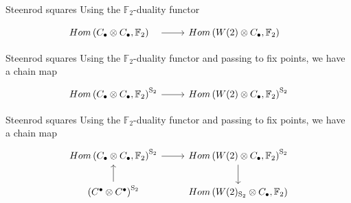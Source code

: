 \documentclass[10pt,t]{beamer} %
\newcommand{\F}{\mathbb{F}}
\renewcommand{\S}{\mathrm{S}}
\begin{document}
\begin{frame}[fragile]{Steenrod squares}
	Using the $\F_2$-duality functor
	\begin{equation*}
	\begin{tikzcd}
	Hom\left(C_\bullet \otimes C_\bullet, \F_2 \right)^{\phantom{\S_2}} \arrow[r] &
	Hom\left(W(2) \otimes C_\bullet, \F_2 \right)^{\phantom{\S_2}}
	\end{tikzcd}
	\end{equation*}
\end{frame}
\begin{frame}[fragile]{Steenrod squares}
	Using the $\F_2$-duality functor and passing to fix points, we have a chain map 
	\begin{equation*}
	\begin{tikzcd}
	Hom\left(C_\bullet \otimes C_\bullet, \F_2 \right)^{\S_2} \arrow[r] &
	Hom\left(W(2) \otimes C_\bullet, \F_2 \right)^{\S_2}
	\end{tikzcd}
	\end{equation*}
	\addtocounter{framenumber}{-1}
\end{frame}
\begin{frame}[fragile]{Steenrod squares}
	Using the $\F_2$-duality functor and passing to fix points, we have a chain map 
	\begin{equation*}
	\begin{tikzcd}
	Hom\left(C_\bullet \otimes C_\bullet, \F_2 \right)^{\S_2} \arrow[r] &
	Hom\left(W(2) \otimes C_\bullet, \F_2 \right)^{\S_2} \arrow[d] \\
	\left(C^\bullet \otimes C^\bullet\right)^{\S_2} \arrow[u] &
	Hom\left(W(2)_{\S_2} \otimes C_\bullet, \F_2 \right)
	\end{tikzcd}
	\end{equation*}
	\addtocounter{framenumber}{-1}
\end{frame}
\end{document}
